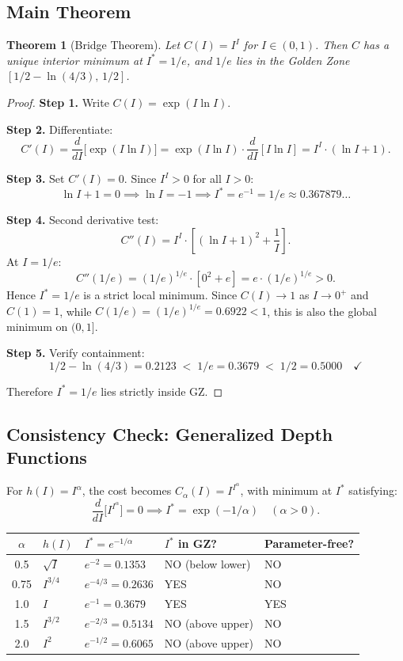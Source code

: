 \documentclass[11pt,a4paper]{article}
\newtheorem{theorem}{Theorem}
\begin{document}
\subsection{Main Theorem}

\begin{theorem}[Bridge Theorem]
Let $C(I) = I^I$ for $I \in (0, 1)$. Then $C$ has a unique interior minimum at $I^* = 1/e$, and $1/e$ lies in the Golden Zone $[1/2 - \ln(4/3),\, 1/2]$.
\end{theorem}

\begin{proof}
\textbf{Step 1.} Write $C(I) = \exp(I \ln I)$.

\textbf{Step 2.} Differentiate:
\[
C'(I) = \frac{d}{dI}\bigl[\exp(I \ln I)\bigr]
       = \exp(I \ln I) \cdot \frac{d}{dI}[I \ln I]
       = I^I \cdot (\ln I + 1).
\]

\textbf{Step 3.} Set $C'(I) = 0$. Since $I^I > 0$ for all $I > 0$:
\[
\ln I + 1 = 0 \implies \ln I = -1 \implies I^* = e^{-1} = 1/e \approx 0.367879\ldots
\]

\textbf{Step 4.} Second derivative test:
\[
C''(I) = I^I \cdot \left[(\ln I + 1)^2 + \frac{1}{I}\right].
\]
At $I = 1/e$:
\[
C''(1/e) = (1/e)^{1/e} \cdot \left[0^2 + e\right] = e \cdot (1/e)^{1/e} > 0.
\]
Hence $I^* = 1/e$ is a strict local minimum. Since $C(I) \to 1$ as $I \to 0^+$ and $C(1) = 1$, while $C(1/e) = (1/e)^{1/e} = 0.6922 < 1$, this is also the global minimum on $(0, 1]$.

\textbf{Step 5.} Verify containment:
\[
1/2 - \ln(4/3) = 0.2123 \;<\; 1/e = 0.3679 \;<\; 1/2 = 0.5000 \quad \checkmark
\]

Therefore $I^* = 1/e$ lies strictly inside GZ.
\end{proof}

\subsection{Consistency Check: Generalized Depth Functions}

For $h(I) = I^\alpha$, the cost becomes $C_\alpha(I) = I^{I^\alpha}$, with minimum at $I^*$ satisfying:
\[
\frac{d}{dI}\bigl[I^{I^\alpha}\bigr] = 0 \implies I^* = \exp(-1/\alpha) \quad (\alpha > 0).
\]

\begin{center}
\begin{tabular}{cllll}
\toprule
$\alpha$ & $h(I)$ & $I^* = e^{-1/\alpha}$ & $I^*$ in GZ? & Parameter-free? \\
\midrule
0.5  & $\sqrt{I}$    & $e^{-2} = 0.1353$  & NO (below lower) & NO  \\
0.75 & $I^{3/4}$     & $e^{-4/3} = 0.2636$ & YES              & NO  \\
1.0  & $I$           & $e^{-1} = 0.3679$  & YES              & YES \\
1.5  & $I^{3/2}$     & $e^{-2/3} = 0.5134$ & NO (above upper) & NO  \\
2.0  & $I^2$         & $e^{-1/2} = 0.6065$ & NO (above upper) & NO  \\
\bottomrule
\end{tabular}
\end{center}
\end{document}
